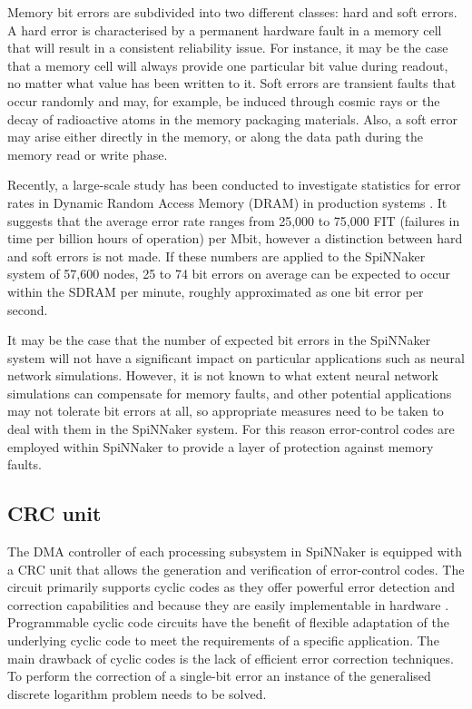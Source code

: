 \documentclass[a4paper, 11pt]{article}
\begin{document}
Memory bit errors are subdivided into two different classes: hard and soft errors. A hard error is characterised by a permanent hardware fault in a memory cell that will result in a consistent reliability issue. For instance, it may be the case that a memory cell will always provide one particular bit value during readout, no matter what value has been written to it. Soft errors are transient faults that occur randomly and may, for example, be induced through cosmic rays or the decay of radioactive atoms in the memory packaging materials. Also, a soft error may arise either directly in the memory, or along the data path during the memory read or write phase.

Recently, a large-scale study has been conducted to investigate statistics for error rates in Dynamic Random Access Memory (DRAM) in production systems \citep{schroeder2009dram}. It suggests that the average error rate ranges from 25,000 to 75,000 FIT (failures in time per billion hours of operation) per Mbit, however a distinction between hard and soft errors is not made. If these numbers are applied to the SpiNNaker system of 57,600 nodes, 25 to 74 bit errors on average can be expected to occur within the SDRAM per minute, roughly approximated as one bit error per second.

It may be the case that the number of expected bit errors in the SpiNNaker system will not have a significant impact on particular applications such as neural network simulations. However, it is not known to what extent neural network simulations can compensate for memory faults, and other potential applications may not tolerate bit errors at all, so appropriate measures need to be taken to deal with them in the SpiNNaker system. For this reason error-control codes are employed within SpiNNaker to provide a layer of protection against memory faults.

\subsection{CRC unit}
The DMA controller of each processing subsystem in SpiNNaker is equipped with a CRC unit that allows the generation and verification of error-control codes. The circuit primarily supports cyclic codes as they offer powerful error detection and correction capabilities and because they are easily implementable in hardware \citep{costello2004error}. Programmable cyclic code circuits have the benefit of flexible adaptation of the underlying cyclic code to meet the requirements of a specific application. The main drawback of cyclic codes is the lack of efficient error correction techniques. To perform the correction of a single-bit error an instance of the generalised discrete logarithm problem needs to be solved.
\end{document}
